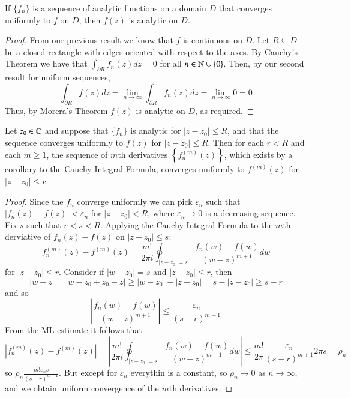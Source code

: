 \documentclass[12pt, a4paper, oneside, openright, titlepage]{book}
\begin{document}
\begin{thm}
    If $\{f_n\}$ is a sequence of analytic functions on a domain $D$ that converges uniformly to $f$ on $D$, then $f(z)$ is analytic on $D$.
\end{thm}
\begin{proof}
    From our previous result we know that $f$ is continuous on $D$. Let $R \subseteq D$ be a closed rectangle with edges oriented with respect to the axes. By Cauchy's Theorem we have that $\int_{\partial R}f_n(z)dz = 0$ for all $n \in \mathbb N\cup \{0\}$. Then, by our second result for uniform sequences, \begin{equation*}
        \int_{\partial R}f(z)dz = \lim\limits_{n\rightarrow \infty}\int_{\partial R}f_n(z)dz = \lim\limits_{n\rightarrow \infty}0 = 0
    \end{equation*}
    Thus, by Morera's Theorem $f(z)$ is analytic on $D$, as required.
\end{proof}


\begin{thm}
    Let $z_0 \in \mathbb C$ and suppose that $\{f_n\}$ is analytic for $|z-z_0| \leq R$, and that the sequence converges uniformly to $f(z)$ for $|z-z_0| \leq R$. Then for each $r < R$ and each $m\geq 1$, the sequence of $m$th derivatives $\left\{f^{(m)}_n(z)\right\}$, which exists by a corollary to the Cauchy Integral Formula, converges uniformly to $f^{(m)}(z)$ for $|z-z_0| \leq r$.
\end{thm}
\begin{proof}
    Since the $f_n$ converge uniformly we can pick $\varepsilon_n$ such that $|f_n(z) - f(z)| < \varepsilon_n$ for $|z - z_0| < R$, where $\varepsilon_n\rightarrow 0$ is a decreasing sequence. Fix $s$ such that $r < s < R$. Applying the Cauchy Integral Formula to the $m$th derviative of $f_n(z)-f(z)$ on $|z-z_0|\leq s$: \begin{equation*}
        f_n^{(m)}(z) - f^{(m)}(z) = \frac{m!}{2\pi i}\oint_{|z-z_0|=s}\frac{f_n(w)- f(w)}{(w-z)^{m+1}}dw
    \end{equation*}
    for $|z-z_0| \leq r$. Consider if $|w-z_0| = s$ and $|z-z_0| \leq r$, then \begin{equation*}
        |w-z| = |w-z_0+z_0-z| \geq |w-z_0|-|z-z_0| = s-|z-z_0| \geq s-r 
    \end{equation*}
    and so \begin{equation*}
        \left|\frac{f_n(w)-f(w)}{(w-z)^{m+1}}\right|\leq \frac{\varepsilon_n}{(s-r)^{m+1}}
    \end{equation*}
    From the ML-estimate it follows that \begin{equation*}
        \left|f_n^{(m)}(z) - f^{(m)}(z) \right|= \left|\frac{m!}{2\pi i}\oint_{|z-z_0|=s}\frac{f_n(w)- f(w)}{(w-z)^{m+1}}dw\right| \leq \frac{m!}{2\pi}\frac{\varepsilon_n}{(s-r)^{m+1}}2\pi s = \rho_n
    \end{equation*}
    so $\rho_n \frac{m!\varepsilon_ns}{(s-r)^{m+1}}$. But except for $\varepsilon_n$ everythin is a constant, so $\rho_n\rightarrow 0$ as $n\rightarrow \infty$, and we obtain uniform convergence of the $m$th derivatives.
\end{proof}
\end{document}
